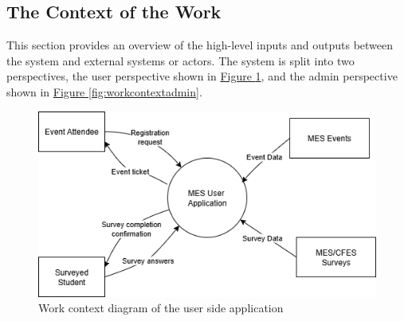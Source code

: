 \documentclass[12pt]{article}
\begin{document}
%

\subsection{The Context of the Work}

This section provides an overview of the high-level inputs and outputs between the system and external systems or actors.
The system is split into two perspectives, the user perspective shown in \hyperref[fig:workcontextuser]{Figure \ref{fig:workcontextuser}}, and the admin perspective shown in \hyperref[fig:workcontextadmin]{Figure \ref{fig:workcontextadmin}}. 

\begin{center}
\begin{figure}[H]
    \centering
    \includegraphics[width=1\linewidth]{images/work_context_user.png}
    \caption{Work context diagram of the user side application}\label{fig:workcontextuser}
\end{figure}
\end{center}
\end{document}
